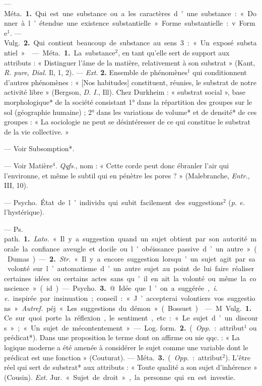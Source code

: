 \begin{itemize}[leftmargin=1cm, label=, itemsep=1pt]
 — \si{Méta.} {\bf 1.} Qui est une
substance ou a les caractères d'une
substance : « Donner à l'étendue
une existence substantielle ». Forme
substantielle : v. Forme$^1$. — \si{Vulg.}
 {\bf 2.} Qui contient beaucoup de substance au sens 3 : « Un exposé substantiel. »

 — \si{Méta.} {\bf 1.} La
substance$^2$, en tant qu’elle sert de
support aux attributs : « Distinguer
l'âme de la matière, relativement à
son substrat » (Kant, {\it R. pure}, {\it Dial.}
Il, 1, 2). — {\it Ext.} {\bf 2.} Ensemble de
phénomènes$^1$ qui conditionnent
d’autres phénomènes : « [Nos habitudes] constituent, réunies, le substrat de notre activité libre » (Bergson, {\it D. I.}, Ill). Chez Durkheim :
« substrat social », base morphologique* de la société consistant
1° dans la répartition des groupes
sur le sol (géographie humaine) ;
2° dans les variations de volume* et
de densité* de ces groupes : « La
sociologie ne peut se désintéresser
de ce qui constitue le substrat de la
vie collective. »

 — Voir Subsomption*.

 — Voir Matière$^4$. {\it Qqfs.}, nom :
« Cette corde peut donc ébranler
l’air qui l’environne, et même le
subtil qui en pénètre les pores ? »
(Malebranche, {\it Entr.}, III, 10).

 — \si{Psycho.} État de l’individu qui subit facilement des suggestions$^2$ ({\it p. e.} l’hystérique).

 — \si{Ps. path.} {\bf 1.} {\it Lato.} « Il y
a suggestion quand un sujet obtient
par son autorité morale la confiance
aveugle et docile ou l'obéissance
passive d’un autre » (Dumas). — {\bf 2.}
{\it Str.} « Il y a encore suggestion lorsqu’un sujet agit par sa volonté sur
l’automatisme d’un autre sujet au
point de lui faire réaliser certaines
idées ou certains actes sans qu'il
en ait la volonté ou même la conscience » (id.).

— \si{Psycho.} {\bf 3.} @. Idée que l’on a
suggérée, {\it i. e.} inspirée par insinuation ;
conseil : « J’accepterai volontiers
vos suggestions ». {\it Autref.} péj.
« Les suggestions du démon » (Bossuet).

 — M. \si{Vulg.} {\bf 1.} Ce sur quoi porte
la réflexion, le sentiment, etc. : « Le
sujet d’un discours »; « Un sujet de
mécontentement ». — \si{Log. form.}
 {\bf 2.} ({\it Opp.} : attribut$^1$ ou prédicat*).
Dans une proposition le terme
dont on affirme ou nie qqc. : « La
logique moderne a été amenée à
considérer le sujet comme une variable dont le prédicat est une fonction » (Couturat). — \si{Méta.} {\bf 3.} ({\it Opp.} :
attribut$^2$). L'être réel qui sert de
substrat* aux attributs : « Toute
qualité a son sujet d’inhérence »
(Cousin). {\it Ext.} \si{Jur.} « Sujet de droit »,
la personne qui en est investie.


\end{itemize}
